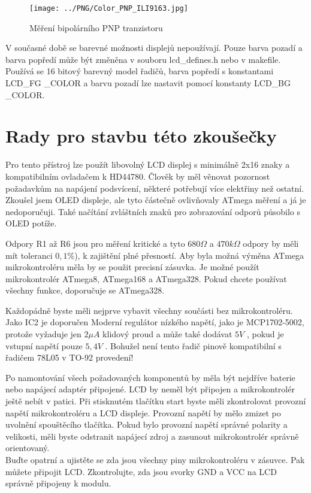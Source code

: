 \begin{figure}[H]
\centering
\texttt{[image: ../PNG/Color\_PNP\_ILI9163.jpg]}
\caption{Měření bipolárního PNP tranzistoru}
\label{fig:Color_PNP}
\end{figure}
\vspace{-0.3cm} 
V současné době se barevné možnosti displejů nepoužívají. Pouze barva pozadí
a barva popředí může být změněna v souboru lcd\_defines.h nebo v makefile.
Používá se 16 bitový barevný model řadičů, barva popředí s konstantami
LCD\_FG \_COLOR a barvu pozadí lze nastavit pomocí konstanty LCD\_BG \_COLOR.
\vspace{-0.3cm}
\section{Rady pro stavbu této zkoušečky}
\vspace{-0.3cm}
Pro tento přístroj lze použít libovolný LCD displej s minimálně 2x16 znaky a kompatibilním
ovladačem k HD44780.
Člověk by měl věnovat pozornost požadavkům na napájení podsvícení, některé potřebují 
více elektřiny než ostatní.
Zkoušel jsem OLED displeje, ale tyto částečně ovlivňovaly ATmega měření
a já je nedoporučuji. Také načítání zvláštních znaků pro zobrazování odporů působilo
s OLED potíže.

Odpory R1 až R6 jsou pro měření kritické a tyto \(680\Omega\) a \(470k\Omega\) odpory
by měli mít toleranci \(0,1\%\)), k zajištění plné přesností.
Aby byla možná výměna ATmega mikrokontroléru měla by se použit precisní zásuvka.
Je možné použít mikrokontrolér ATmega8, ATmega168 a ATmega328.
Pokud chcete používat všechny funkce, doporučuje se ATmega328.

Každopádně byste měli nejprve vybavit všechny součásti bez mikrokontroléru.
Jako IC2 je doporučen Moderní regulátor nízkého napětí, jako je MCP1702-5002,
protože vyžaduje jen \(2\mu A\) klidový proud a může také dodávat \(5V\) , 
pokud je vstupní napětí pouze \(5,4V\) .
Bohužel není tento řadič pinově kompatibilní s řadičem 78L05 v TO-92 provedení!

Po namontování všech požadovaných komponentů by měla být nejdříve baterie 
nebo napájecí adaptér připojené. LCD by neměl být připojen a mikrokontrolér ještě
nebít v patici.
Při stisknutém tlačítku start byste měli zkontrolovat provozní napětí mikrokontroléru a LCD displeje.
Provozní napětí by mělo zmizet po uvolnění spouštěcího tlačítka.
Pokud bylo provozní napětí správné polarity a velikosti,
měli byste odstranit napájecí zdroj a zasunout mikrokontrolér správně orientovaný.\\
Buďte opatrní a ujistěte se zda jsou všechny piny mikrokontroléru v zásuvce.
Pak můžete připojit LCD. Zkontrolujte, zda jsou svorky GND a VCC na LCD správně připojeny k modulu.

